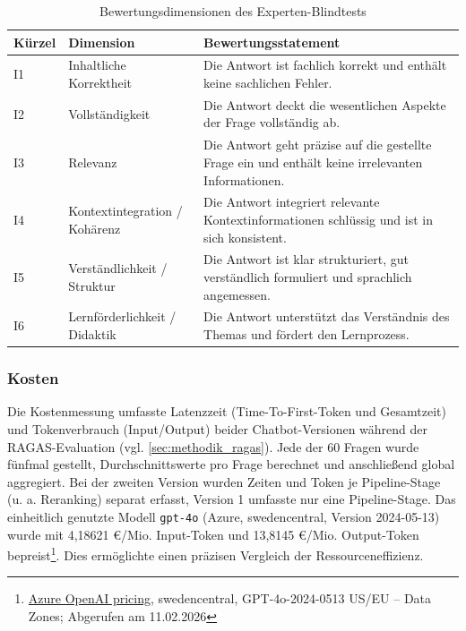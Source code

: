 \begin{table}[H]
\centering
\caption{Bewertungsdimensionen des Experten-Blindtests}
\label{tab:experten_kriterien}
\begin{tabular}{>{\raggedright\arraybackslash}p{1.5cm} >{\raggedright\arraybackslash}p{3.5cm} >{\raggedright\arraybackslash}p{7cm}}
\hline
\textbf{Kürzel} & \textbf{Dimension} & \textbf{Bewertungsstatement} \\
\hline
I1 & Inhaltliche Korrektheit & Die Antwort ist fachlich korrekt und enthält keine sachlichen Fehler. \\
I2 & Vollständigkeit & Die Antwort deckt die wesentlichen Aspekte der Frage vollständig ab. \\
I3 & Relevanz & Die Antwort geht präzise auf die gestellte Frage ein und enthält keine irrelevanten Informationen. \\
I4 & Kontextintegration / Kohärenz & Die Antwort integriert relevante Kontextinformationen schlüssig und ist in sich konsistent. \\
I5 & Verständlichkeit / Struktur & Die Antwort ist klar strukturiert, gut verständlich formuliert und sprachlich angemessen. \\
I6 & Lernförderlichkeit / Didaktik & Die Antwort unterstützt das Verständnis des Themas und fördert den Lernprozess. \\
\hline
\end{tabular}
\end{table}

\subsubsection{Kosten}
\label{sec:methodik_kosten}

Die Kostenmessung umfasste Latenzzeit (Time-To-First-Token und Gesamtzeit) und Tokenverbrauch (Input/Output) beider Chatbot-Versionen während der RAGAS-Evaluation (vgl. \autoref{sec:methodik_ragas}). Jede der 60 Fragen wurde fünfmal gestellt, Durchschnittswerte pro Frage berechnet und anschließend global aggregiert. Bei der zweiten Version wurden Zeiten und Token je Pipeline-Stage (u. a. Reranking) separat erfasst, Version 1 umfasste nur eine Pipeline-Stage. Das einheitlich genutzte Modell \texttt{gpt-4o} (Azure, swedencentral, Version 2024-05-13) wurde mit 4,18621 €/Mio. Input-Token und 13,8145 €/Mio. Output-Token bepreist\footnote{\href{https://azure.microsoft.com/en-us/pricing/details/azure-openai/\#pricing}{Azure OpenAI pricing}, swedencentral, GPT-4o-2024-0513 US/EU – Data Zones; Abgerufen am 11.02.2026}. Dies ermöglichte einen präzisen Vergleich der Ressourceneffizienz.

